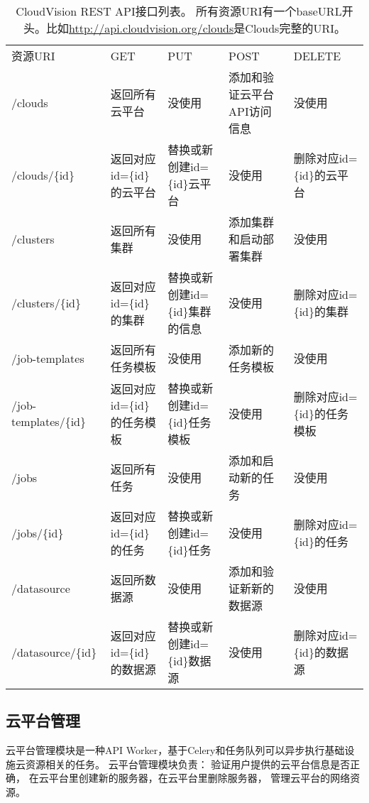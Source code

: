 \begin{table}[H]
  \centering
  \begin{minipage}[t]{0.98\linewidth} %
  \caption[CloudVision API接口列表]{CloudVision REST API接口列表。
    所有资源URI有一个baseURL开头。比如\url{http://api.cloudvision.org/clouds}是Clouds完整的URI。}
  \label{tab:cloudvision-api}
    \begin{tabularx}{\linewidth}{lXXXX}
      \toprule[1.5pt]
        资源URI & GET & PUT & POST & DELETE \\
        /clouds & 返回所有云平台 & 没使用 & 添加和验证云平台API访问信息 & 没使用 \\
        /clouds/\{id\} & 返回对应id=\{id\}的云平台 & 替换或新创建id=\{id\}云平台 &  没使用 & 删除对应id=\{id\}的云平台 \\
        /clusters & 返回所有集群 & 没使用 & 添加集群和启动部署集群 & 没使用 \\
        /clusters/\{id\} & 返回对应id=\{id\}的集群 & 替换或新创建id=\{id\}集群的信息 &  没使用 & 删除对应id=\{id\}的集群 \\
        /job-templates & 返回所有任务模板 & 没使用 & 添加新的任务模板 & 没使用 \\
        /job-templates/\{id\} & 返回对应id=\{id\}的任务模板 & 替换或新创建id=\{id\}任务模板 &  没使用 & 删除对应id=\{id\}的任务模板 \\
        /jobs & 返回所有任务 & 没使用 & 添加和启动新的任务 & 没使用 \\
        /jobs/\{id\} & 返回对应id=\{id\}的任务 & 替换或新创建id=\{id\}任务 &  没使用 & 删除对应id=\{id\}的任务 \\
        /datasource & 返回所数据源 & 没使用 & 添加和验证新新的数据源 & 没使用 \\
        /datasource/\{id\} & 返回对应id=\{id\}的数据源 & 替换或新创建id=\{id\}数据源 &  没使用 & 删除对应id=\{id\}的数据源 \\
      \bottomrule[1.5pt]
    \end{tabularx}
  \end{minipage}
\end{table}


\subsection{云平台管理}
\label{subsec:api-worker-cloud}
云平台管理模块是一种API Worker，基于Celery和任务队列可以异步执行基础设施云资源相关的任务。
云平台管理模块负责： 验证用户提供的云平台信息是否正确，
在云平台里创建新的服务器，在云平台里删除服务器，
管理云平台的网络资源。

